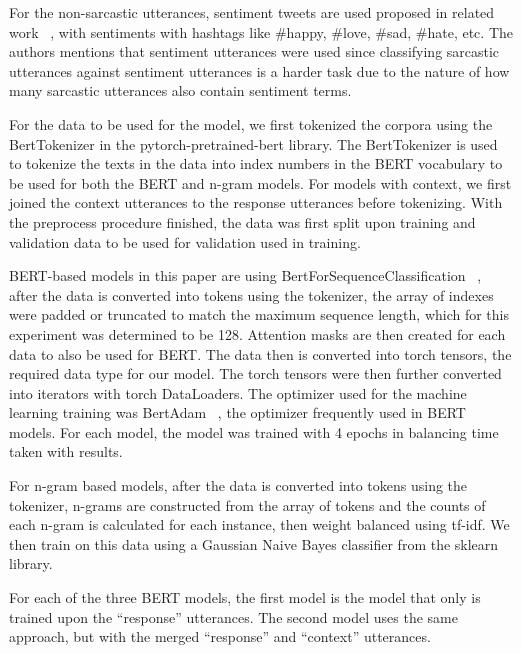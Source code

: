 \documentclass[11pt,a4paper]{article}
\begin{document}
For the non-sarcastic utterances, sentiment tweets are used proposed in related work ~\cite{Ghosh-Muresan}, with sentiments with hashtags like \#happy, \#love, \#sad, \#hate, etc. The authors mentions that sentiment utterances were used since classifying sarcastic utterances against sentiment utterances is a harder task due to the nature of how many sarcastic utterances also contain sentiment terms.

For the data to be used for the model, we first tokenized the corpora using the BertTokenizer in the pytorch-pretrained-bert library. The BertTokenizer is used to tokenize the texts in the data into index numbers in the BERT vocabulary to be used for both the BERT and n-gram models. For models with context, we first joined the context utterances to the response utterances before tokenizing. With the preprocess procedure finished, the data was first split upon training and validation data to be used for validation used in training.

BERT-based models in this paper are using BertForSequenceClassification ~\cite{devlin-etal-2019-bert}, after the data is converted into tokens using the tokenizer, the array of indexes were padded or truncated to match the maximum sequence length, which for
this experiment was determined to be 128. Attention masks are then created for each data to also be used for BERT. 
The data then is converted into torch tensors, the required data type for our model. The torch tensors were then further converted into iterators with torch DataLoaders. The
optimizer used for the machine learning training was BertAdam ~\cite{devlin-etal-2019-bert}, the optimizer frequently used in BERT models. For each model, the model was trained
with 4 epochs in balancing time taken with results. 

For n-gram based models, after the data is converted into tokens using the tokenizer, n-grams are constructed from the array of tokens and the counts of each n-gram is calculated
for each instance, then weight balanced using tf-idf. We then train on this data using a Gaussian Naive Bayes classifier from the sklearn library.

For each of the three BERT models, the first model is the model that only is trained upon the “response” utterances. The second model uses the same approach, but with the merged “response” and “context” utterances.
\end{document}
